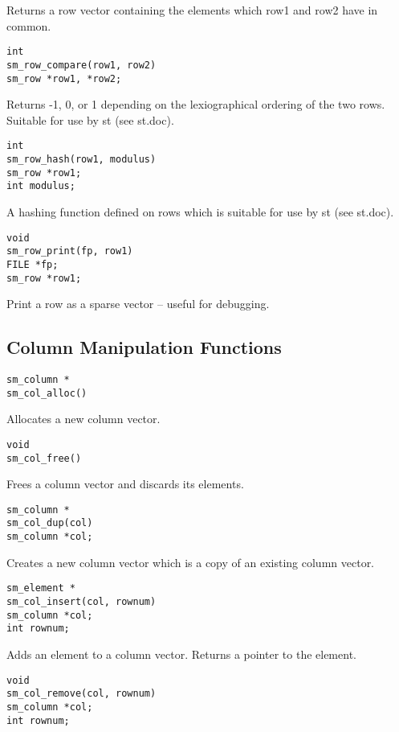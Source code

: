         Returns a row vector containing the elements which row1 and
        row2 have in common.


\begin{verbatim}
int
sm_row_compare(row1, row2)
sm_row *row1, *row2;
\end{verbatim}

        Returns -1, 0, or 1 depending on the lexiographical ordering
        of the two rows.  Suitable for use by st (see st.doc).


\begin{verbatim}
int
sm_row_hash(row1, modulus)
sm_row *row1;
int modulus;
\end{verbatim}

        A hashing function defined on rows which is suitable for use
        by st (see st.doc).


\begin{verbatim}
void
sm_row_print(fp, row1)
FILE *fp;
sm_row *row1;
\end{verbatim}

        Print a row as a sparse vector -- useful for debugging.

\subsection{Column Manipulation Functions}

\begin{verbatim}
sm_column *
sm_col_alloc()
\end{verbatim}

        Allocates a new column vector.

\begin{verbatim}
void
sm_col_free()
\end{verbatim}

        Frees a column vector and discards its elements.


\begin{verbatim}
sm_column *
sm_col_dup(col)
sm_column *col;
\end{verbatim}

        Creates a new column vector which is a copy of an existing
        column vector.


\begin{verbatim}
sm_element *
sm_col_insert(col, rownum)
sm_column *col;
int rownum;
\end{verbatim}

        Adds an element to a column vector.  Returns a pointer to the element.


\begin{verbatim}
void
sm_col_remove(col, rownum)
sm_column *col;
int rownum;
\end{verbatim}

